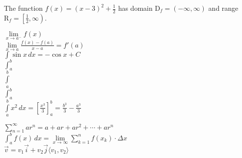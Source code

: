 \documentclass[11pt]{article}
\begin{document}
The function $f(x)=(x-3)^2+\frac{1}{2}$ has domain $\mathrm{D}_f=(-\infty,\infty)$  
and range $\mathrm{R}_f=\left[\frac{1}{2},\infty\right)$.

$\lim \limits_{x \to a^-} f(x)$\\

$\displaystyle\lim \limits_{x \to a} \frac{f(x)-f(a)}{x-a}=f'(a)$\\

$\displaystyle\int \sin x \, dx=-\cos x + C$\\

$\int_a^b$\\

$\int \limits_a^b$\\

$\displaystyle\int_a^b$\\

$\displaystyle\int \limits_a^b x^2 \, dx=\left[\frac{x^3}{3}\right]_a^b=\frac{b^3}
{3}-\frac{a^3}{3}$

$\displaystyle{\sum \limits_{n=1}^{\infty}ar^n=a+ar+ar^2+ \cdots +ar^n}$\\

$\displaystyle{\int_a^b f(x) \,dx=\lim \limits_{x \to \infty} \sum \limits_{k=1}^{n}
f(x_k) \cdot \Delta x}$\\

$\vec{v}=v_1 \vec{i}+v_2 \vec{j}\langle v_1, v_2 \rangle$
\end{document}
